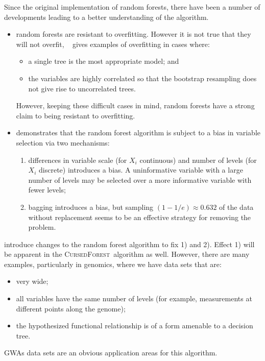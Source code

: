 \documentclass[10pt,letterpaper]{article}
\newcommand{\cursedforest}{\textsc{CursedForest}\ }
\begin{document}
Since the original implementation of random forests, there have been a number of developments leading to a better
understanding of the algorithm.
\begin{itemize}
\item random forests are resistant to overfitting. However it is not true that they will not overfit,
  ~\cite{Segal.2004} gives examples of overfitting in cases where:
  \begin{itemize}
  \item a single tree is the most appropriate model; and
  \item the variables are highly correlated so that the bootstrap resampling does not give rise to uncorrelated trees.
  \end{itemize}
However, keeping these difficult cases in mind, random forests have a strong claim to being resistant to overfitting.
\item \cite{Strobl.et.al.2007} demonstrates that the random forest algorithm is subject to a bias in variable selection
  via two mechanisms:
  \begin{enumerate}
  \item differences in variable scale (for $X_i$ continuous) and number of levels (for $X_i$ discrete) introduces a
    bias. A uninformative variable with a large number of levels may be selected over a more informative variable with
    fewer levels;
  \item bagging introduces a bias, but sampling $(1- 1/e) \approx 0.632$ of the data without replacement seems to be an
    effective strategy for removing the problem.
  \end{enumerate}
\end{itemize} 

\cite{Strobl.et.al.2007} introduce changes to the random forest algorithm to fix 1) and 2).  Effect 1) will be apparent
in the \cursedforest algorithm as well.  However, there are many examples, particularly in genomics, where we have data
sets that are:
\begin{itemize}
\item very wide;
\item all variables have the same number of levels (for example, measurements at different points along the genome);
\item the hypothesized functional relationship is of a form amenable to a decision tree.
\end{itemize}
GWAs data sets are an obvious application areas for this algorithm. 
\end{document}
